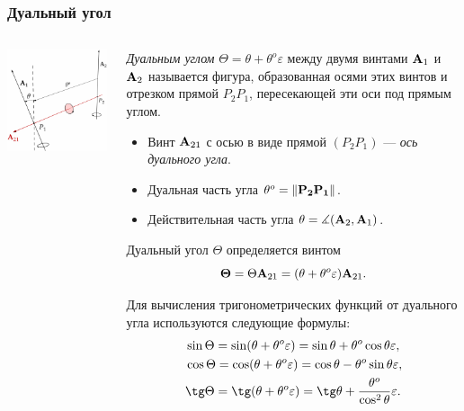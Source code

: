 \begin{frame}
  \frametitle{Дуальный угол}
  \begin{columns}
    \begin{column}{0.4\textwidth}
      \begin{center}
        \includegraphics{img/screws/moment05}
      \end{center}
    \end{column}
    \begin{column}{0.6\textwidth}
      \emph{Дуальным углом} $\Theta = \theta + \theta^{o}\varepsilon$ между двумя винтами $\vb{A}_1$ и $\vb{A}_2$ называется фигура, образованная осями этих винтов и отрезком прямой $P_2P_1$, пересекающей эти оси под прямым углом.
      \begin{itemize}
        \item Винт $\vb{A}_{21}$ с осью в виде прямой $(P_2P_1)$ — \emph{ось дуального угла}.
        \item Дуальная часть угла $\theta^{o} = \norm{\vb{P_2P_1}}$.
        \item Действительная часть угла $\theta = \measuredangle (\vb{A}_2, \vb{A}_1)$.
      \end{itemize}
      Дуальный угол $\Theta$ определяется винтом
      \begin{equation*}
        \vb{\Theta} = \Theta \vb{A}_{21} = (\theta + \theta^{o}\varepsilon)\vb{A}_{21}.
      \end{equation*}

      Для вычисления тригонометрических функций от дуального угла используются следующие формулы:
      \begin{align*}
        &\sin \Theta = \sin (\theta + \theta^{o}\varepsilon) = \sin \theta + \theta^{o} \cos\theta \varepsilon,\\
        &\cos \Theta = \cos (\theta + \theta^{o}\varepsilon) = \cos\theta - \theta^{o} \sin\theta \varepsilon,\\
        &\tg \Theta = \tg (\theta + \theta^{o}\varepsilon) = \tg \theta + \dfrac{\theta^o}{\cos^2\theta}\varepsilon.
      \end{align*}
    \end{column}
  \end{columns}
\end{frame}

